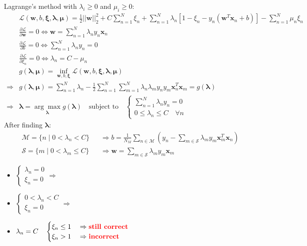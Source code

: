  Lagrange's method with $\lambda_i \geq 0$ and $\mu_i \geq 0$:
\begin{align}
	&\mathcal{L}(\textbf{w}, b, \boldsymbol{\xi, \lambda, \mu}) = \frac{1}{2} || \textbf{w} ||^2_2 + C \sum_{n=1}^{N} \xi_n + \sum_{n=1}^{N} \lambda_n [ 1-\xi_n - y_n(\textbf{w}^T \textbf{x}_n +b) ] - \sum_{n=1}^{N} \mu_n\xi_n \\
	&\frac{\partial \mathcal{L}}{\partial \textbf{w}} = 0 \iff \textbf{w} = \sum_{n=1}^N \lambda_n y_n \textbf{x}_n\\
	&\frac{\partial \mathcal{L}}{\partial b} = 0 \iff \sum_{n=1}^N \lambda_n y_n = 0\\
	&\frac{\partial \mathcal{L}}{\partial \xi_n} = 0 \iff \lambda_n = C - \mu_n\\
	&g(\boldsymbol{\lambda, \mu}) = \underset{\textbf{w}, b, \boldsymbol{\xi}}{\inf} \mathcal{L}(\textbf{w}, b, \boldsymbol{\xi, \lambda, \mu})\\
	\Rightarrow &g(\boldsymbol{\lambda, \mu}) = \sum_{n=1}^{N} \lambda_n - \frac{1}{2} \sum_{n=1}^{N} \sum_{m=1}^{N} \lambda_n \lambda_m y_n y_m \textbf{x}_n^T \textbf{x}_m = g(\boldsymbol{\lambda})\\
	\Rightarrow &\boldsymbol{\lambda} = \underset{\boldsymbol{\lambda}}{\arg\max} g(\boldsymbol{\lambda}) \quad \text{subject to} \quad \begin{cases}
		\sum_{n=1}^{N} \lambda_n y_n=0\\
		0 \leq \lambda_n \leq C \quad \forall n
	\end{cases}
\end{align}
After finding $\boldsymbol{\lambda}$:
\begin{align}
	&\mathcal{M} = \{ n \;|\; 0 < \lambda_n < C \} &&\Rightarrow b=\frac{1}{N_M} \sum_{n \in \mathcal{M}} \left( y_n - \sum_{m \in \mathcal{S}} \lambda_m y_m \textbf{x}_m^T \textbf{x}_n \right)\\
	&\mathcal{S} = \{ m \;|\; 0 < \lambda_m \leq C \} &&\Rightarrow \textbf{w} = \sum_{m \in \mathcal{S}} \lambda_m y_m \textbf{x}_m
\end{align}
\begin{itemize}
	\item $\begin{cases}
		\lambda_n =0\\
		\xi_n =0
	\end{cases} \Rightarrow$  
	\item $\begin{cases}
		0 < \lambda_n < C\\
		\xi_n =0
	\end{cases} \Rightarrow$  
	\item $\lambda_n =C \quad \begin{cases}
		\xi_n  \leq 1 \quad\Rightarrow \text{\textbf{\color{red} still correct}}\\
		\xi_n > 1 \quad\Rightarrow \text{\textbf{\color{red} incorrect}}
	\end{cases}$
\end{itemize}

